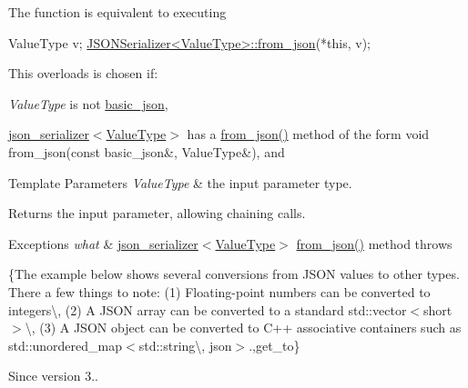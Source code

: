 The function is equivalent to executing 
\begin{DoxyCode}
ValueType v;
\hyperlink{namespacenlohmann_1_1detail_a1f0395aad0fe853a4539288749d3a603}{JSONSerializer<ValueType>::from\_json}(*\textcolor{keyword}{this}, v);
\end{DoxyCode}


This overloads is chosen if\+:
\begin{DoxyItemize}
\item {\itshape Value\+Type} is not \hyperlink{classnlohmann_1_1basic__json}{basic\+\_\+json},
\item \hyperlink{classnlohmann_1_1basic__json_ad6ebc5da7ced975bb184133750e7d49f}{json\+\_\+serializer$<$\+Value\+Type$>$} has a {\ttfamily \hyperlink{namespacenlohmann_1_1detail_aef5c8ea108f4d2b03fb4a635617510de}{from\+\_\+json()}} method of the form {\ttfamily void from\+\_\+json(const basic\+\_\+json\&, Value\+Type\&)}, and
\end{DoxyItemize}


\begin{DoxyTemplParams}{Template Parameters}
{\em Value\+Type} & the input parameter type.\\
\hline
\end{DoxyTemplParams}
\begin{DoxyReturn}{Returns}
the input parameter, allowing chaining calls.
\end{DoxyReturn}

\begin{DoxyExceptions}{Exceptions}
{\em what} & \hyperlink{classnlohmann_1_1basic__json_ad6ebc5da7ced975bb184133750e7d49f}{json\+\_\+serializer$<$\+Value\+Type$>$} {\ttfamily \hyperlink{namespacenlohmann_1_1detail_aef5c8ea108f4d2b03fb4a635617510de}{from\+\_\+json()}} method throws\\
\hline
\end{DoxyExceptions}
\{The example below shows several conversions from J\+S\+ON values to other types. There a few things to note\+: (1) Floating-\/point numbers can be converted to integers\textbackslash{}, (2) A J\+S\+ON array can be converted to a standard {\ttfamily std\+::vector$<$short$>$}\textbackslash{}, (3) A J\+S\+ON object can be converted to C++ associative containers such as {\ttfamily std\+::unordered\+\_\+map$<$std\+::string\textbackslash{}, json$>$}.,get\+\_\+to\}

\begin{DoxySince}{Since}
version 3.. 
\end{DoxySince}
